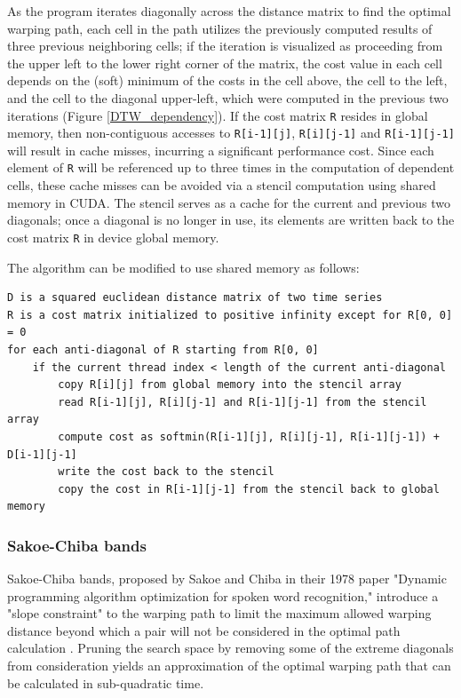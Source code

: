 \documentclass[12pt, letterpaper]{article}
\begin{document}
As the program iterates diagonally across the distance matrix to find the
optimal warping path, each cell in the path utilizes the previously computed
results of three previous neighboring cells; if the iteration is visualized as
proceeding from the upper left to the lower right corner of the matrix, the cost
value in each cell depends on the (soft) minimum of the costs in the cell above,
the cell to the left, and the cell to the diagonal upper-left, which were
computed in the previous two iterations (Figure \ref{DTW_dependency}). If the
cost matrix \verb|R| resides in global memory, then non-contiguous accesses to
\verb|R[i-1][j]|, \verb|R[i][j-1]| and \verb|R[i-1][j-1]| will result in cache
misses, incurring a significant performance cost. Since each element of \verb|R|
will be referenced up to three times in the computation of dependent cells,
these cache misses can be avoided via a stencil computation using shared memory
in CUDA. The stencil serves as a cache for the current and previous two
diagonals; once a diagonal is no longer in use, its elements are written back to
the cost matrix \verb|R| in device global memory.

\FloatBarrier
The algorithm can be modified to use shared memory as follows:

\begin{verbatim}
D is a squared euclidean distance matrix of two time series
R is a cost matrix initialized to positive infinity except for R[0, 0] = 0
for each anti-diagonal of R starting from R[0, 0]
    if the current thread index < length of the current anti-diagonal
        copy R[i][j] from global memory into the stencil array
        read R[i-1][j], R[i][j-1] and R[i-1][j-1] from the stencil array
        compute cost as softmin(R[i-1][j], R[i][j-1], R[i-1][j-1]) + D[i-1][j-1]
        write the cost back to the stencil
        copy the cost in R[i-1][j-1] from the stencil back to global memory
\end{verbatim}
\FloatBarrier

\subsubsection{Sakoe-Chiba bands}

Sakoe-Chiba bands, proposed by Sakoe and Chiba in their 1978 paper "Dynamic
programming algorithm optimization for spoken word recognition," introduce a
"slope constraint" to the warping path to limit the maximum allowed warping
distance beyond which a pair will not be considered in the optimal path
calculation \cite{sakoe_dynamic_1978}. Pruning the search space by removing some
of the extreme diagonals from consideration yields an approximation of the
optimal warping path that can be calculated in sub-quadratic time.
\end{document}
